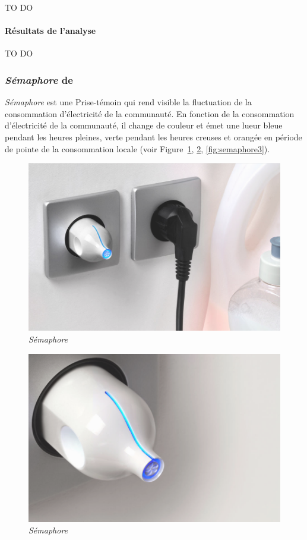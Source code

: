 \documentclass[10pt,a5paper,twoside]{article}
\begin{document}
TO DO

\paragraph{Résultats de l'analyse}\label{ruxe9sultats-de-lanalyse-3}

TO DO

\subsubsection{\emph{Sémaphore} de
\citet{belley2006semaphore}}\label{suxe9maphore-de-belley2006semaphore}

\emph{Sémaphore} est une Prise-témoin qui rend visible la fluctuation de
la consommation d'électricité de la communauté. En fonction de la
consommation d'électricité de la communauté, il change de couleur et
émet une lueur bleue pendant les heures pleines, verte pendant les
heures creuses et orangée en période de pointe de la consommation locale
(voir Figure~\ref{fig:semaphore1}, \ref{fig:semaphore2},
\ref{fig:semaphore3}).

\begin{figure}
\centering
\includegraphics[]{images/semaphore-screenshot1.png}
\caption{\emph{Sémaphore}}\label{fig:semaphore1}
\end{figure}

\begin{figure}
\centering
\includegraphics[]{images/semaphore-screenshot2.png}
\caption{\emph{Sémaphore}}\label{fig:semaphore2}
\end{figure}
\end{document}
